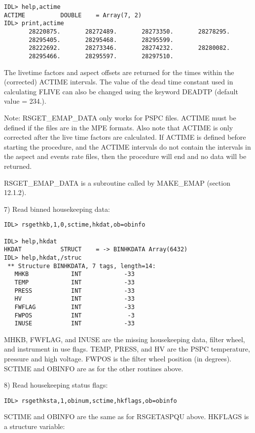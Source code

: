 \medskip\noindent
\begin{verbatim}
IDL> help,actime
ACTIME          DOUBLE    = Array(7, 2)
IDL> print,actime
       28220875.       28272489.       28273350.       28278295.
       28295405.       28295468.       28295599.
       28222692.       28273346.       28274232.       28280082.
       28295466.       28295597.       28297510.
\end{verbatim}
The livetime factors and aspect offsets are returned for the times within
the (corrected) ACTIME intervals. The value of the dead time constant used
in calculating FLIVE can also be changed using the keyword DEADTP (default
value = 234.).
 
Note: RSGET{\_}EMAP{\_}DATA only works for PSPC files. ACTIME must be defined if
the files are in the MPE formats. Also note that ACTIME is only corrected
after the live time factors are calculated. If ACTIME is defined before
starting the procedure, and the ACTIME intervals do not contain the
intervals in the aspect and events rate files, then the procedure will end
and no data will be returned.
 
RSGET{\_}EMAP{\_}DATA is a subroutine called by MAKE{\_}EMAP (section 12.1.2).
 
7) Read binned housekeeping data:

\medskip\noindent
\begin{verbatim}
IDL> rsgethkb,1,0,sctime,hkdat,ob=obinfo
 
IDL> help,hkdat
HKDAT           STRUCT    = -> BINHKDATA Array(6432)
IDL> help,hkdat,/struc
 ** Structure BINHKDATA, 7 tags, length=14:
   MHKB            INT            -33
   TEMP            INT            -33
   PRESS           INT            -33
   HV              INT            -33
   FWFLAG          INT            -33
   FWPOS           INT             -3
   INUSE           INT            -33
\end{verbatim}
MHKB, FWFLAG, and INUSE are the missing housekeeping data, filter wheel, and
instrument in use flags. TEMP, PRESS, and HV are the PSPC temperature, pressure
and high voltage. FWPOS is the filter wheel position (in degrees). SCTIME and
OBINFO are as for the other routines above.
 
8) Read housekeeping status flags:

\medskip\noindent
\begin{verbatim}
IDL> rsgethksta,1,obinum,sctime,hkflags,ob=obinfo
\end{verbatim}
SCTIME and OBINFO are the same as for RSGETASPQU above. HKFLAGS is a structure
variable:

